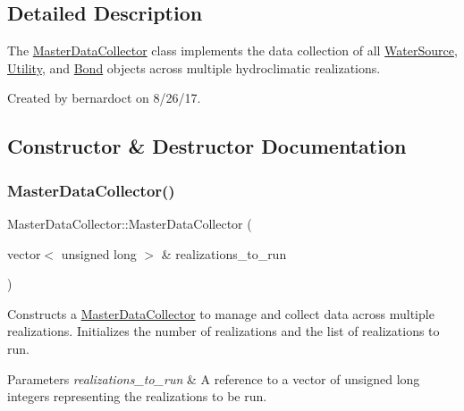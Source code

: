 \subsection{Detailed Description}
The {\ttfamily \mbox{\hyperlink{classMasterDataCollector}{Master\+Data\+Collector}}} class implements the data collection of all \mbox{\hyperlink{classWaterSource}{Water\+Source}}, \mbox{\hyperlink{classUtility}{Utility}}, and \mbox{\hyperlink{classBond}{Bond}} objects across multiple hydroclimatic realizations. 

Created by bernardoct on 8/26/17. 

\subsection{Constructor \& Destructor Documentation}
\mbox{\label{classMasterDataCollector_acb6f64c053bda26e5cf7e4ec8dacd0cd}} 
\subsubsection{\texorpdfstring{Master\+Data\+Collector()}{MasterDataCollector()}}
{\footnotesize\ttfamily Master\+Data\+Collector\+::\+Master\+Data\+Collector (\begin{DoxyParamCaption}\item[{vector$<$ unsigned long $>$ \&}]{realizations\+\_\+to\+\_\+run }\end{DoxyParamCaption})}



Constructs a \mbox{\hyperlink{classMasterDataCollector}{Master\+Data\+Collector}} to manage and collect data across multiple realizations. Initializes the number of realizations and the list of realizations to run. 


\begin{DoxyParams}{Parameters}
{\em realizations\+\_\+to\+\_\+run} & A reference to a vector of unsigned long integers representing the realizations to be run. \\
\hline
\end{DoxyParams}
\mbox{\label{classMasterDataCollector_aedeef15ddcd660886261d8759db37029}} 

